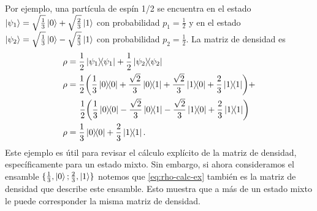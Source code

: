 Por ejemplo, una partícula de espín 1/2 se encuentra en el estado 
$\ket{\psi_1}=\sqrt{\frac{1}{3}}\ket{0} + \sqrt{\frac{2}{3}}\ket{1}$
con probabilidad $p_1=\frac{1}{2}$ y en el estado 
$\ket{\psi_2}=\sqrt{\frac{1}{3}}\ket{0} - \sqrt{\frac{2}{3}}\ket{1}$
con probabilidad $p_2=\frac{1}{2}$. La matriz de densidad es
\begin{align}
	\rho 	&= \frac{1}{2}\dyad{\psi_1}{\psi_1} + 
	\frac{1}{2}\dyad{\psi_2}{\psi_2} \nonumber \\
	\rho	&= \frac{1}{2}\qty(\frac{1}{3}\dyad{0}{0} +
					 \frac{\sqrt{2}}{3}\dyad{0}{1} + 
					 \frac{\sqrt{2}}{3}\dyad{1}{0} +
					 \frac{2}{3}\dyad{1}{1}) + \nonumber \\
				&\hspace{5mm} \frac{1}{2}\qty(\frac{1}{3}\dyad{0}{0} -
					 \frac{\sqrt{2}}{3}\dyad{0}{1} -
					 \frac{\sqrt{2}}{3}\dyad{1}{0} +
					 \frac{2}{3}\dyad{1}{1}) \nonumber \\
	\rho	&= \frac{1}{3}\dyad{0}{0} + \frac{2}{3}\dyad{1}{1}. 
	\label{eq:rho-calc-ex}
\end{align}
Este ejemplo es útil para revisar el cálculo explícito de
la matriz de densidad, específicamente para un estado mixto. Sin
embargo, si ahora consideramos el ensamble $\{ \frac{1}{3}, \ket{0};
\frac{2}{3}, \ket{1} \}$ notemos que \eqref{eq:rho-calc-ex} también es la
matriz de densidad que describe este ensamble. Esto muestra que a más de un
estado mixto  le puede corresponder la misma matriz de densidad.

